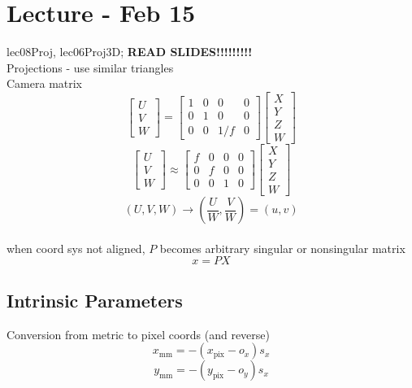 \documentclass{article}
\begin{document}
\section{Lecture - Feb 15}
lec08Proj, 
lec06Proj3D;
\textbf{READ SLIDES!!!!!!!!!}\\[5pt]
Projections - use similar triangles
\\
Camera matrix\[
  \begin{bmatrix}
    U \\ V \\ W
  \end{bmatrix}
  = \begin{bmatrix}
    1 & 0 & 0 & 0\\
    0 & 1 & 0 & 0\\
    0 & 0 & 1/f & 0
  \end{bmatrix}
  \begin{bmatrix}
    X \\ Y \\ Z \\ W
  \end{bmatrix}
\]
\[
  \begin{bmatrix}
    U \\ V\\ W
  \end{bmatrix}\approx
  \begin{bmatrix}
    f & 0 & 0 & 0\\
    0 & f & 0 & 0\\
    0 & 0 & 1 & 0
  \end{bmatrix}
  \begin{bmatrix}
    X \\ Y \\ Z \\ W
  \end{bmatrix}
\]
\[
  (U,V,W) \to \left ( \frac{U}{W}, \frac{V}{W} \right ) = (u,v)
\]
\\[10pt]
when coord sys not aligned, $P$ becomes arbitrary singular or nonsingular matrix
\[
  x = PX
\]


\subsection{Intrinsic Parameters}
Conversion from metric to pixel coords (and reverse)
\[
  x_{\mathrm{mm}} = -(x_{\mathrm{pix}}- o_x )s_x 
\]
\[
  y_{\mathrm{mm}} = -(y_{\mathrm{pix}}- o_y )s_x 
\]
\end{document}
